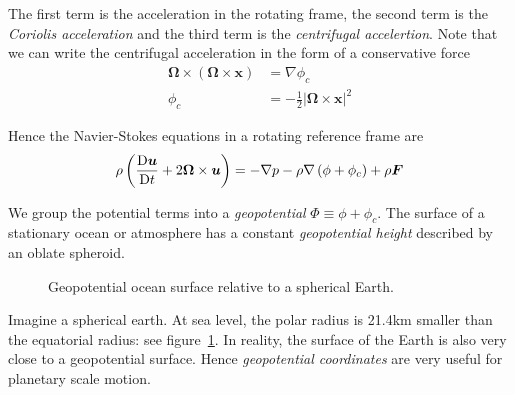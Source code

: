 \documentclass{jknotes}
\begin{document}
The first term is the acceleration in the rotating frame, the second term is
the \emph{Coriolis acceleration} and the third term is the \emph{centrifugal
accelertion}. Note that we can write the centrifugal acceleration in the form
of a conservative force
\begin{equation}
	\begin{aligned}
		\bm{\Omega} \times \left( \bm{\Omega} \times \bm{x}\right) &= \nabla
	\phi_c \\
	\phi_c &= -\frac{1}{2} \left| \bm{\Omega} \times \bm{x} \right|^2
\end{aligned}
\end{equation}

Hence the Navier-Stokes equations in a rotating reference frame are
\begin{equation}
	\rho \left( \frac{\mathrm{D} \bm{u}}{\mathrm{D} t} + 2 \bm{\Omega} \times
	\bm{u}\right) = - \nabla p - \rho \nabla \left( \phi + \phi_c\right) +
	\rho \bm{F} \label{nsrot}
\end{equation}

We group the potential terms into a \emph{geopotential} $\Phi \equiv \phi +
\phi_c$. The surface of a stationary ocean or atmosphere has a constant
\emph{geopotential height} described by an oblate spheroid.

\begin{figure}
\begin{center}
\caption{Geopotential ocean surface relative to a spherical Earth.}
\label{fig:oblate}
\end{center}
\end{figure}

Imagine a spherical earth. At sea level, the polar radius is 21.4km smaller
than the equatorial radius: see figure~\ref{fig:oblate}. In reality, the
surface of the Earth is also very close to a geopotential surface. Hence
\emph{geopotential coordinates} are very useful for planetary scale motion.
\end{document}
